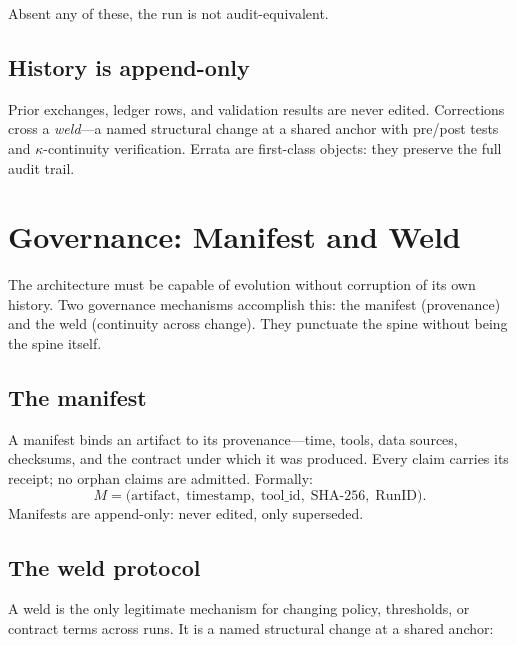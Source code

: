 \documentclass[
  aps,
  prd,
  twocolumn,
  superscriptaddress,
  nofootinbib,
  floatfix
]{revtex4-2}
\newcommand{\beq}{\begin{equation}}
\newcommand{\eeq}{\end{equation}}
\newcommand{\RunID}{\mathrm{RunID}}
\begin{document}
Absent any of these, the run is not audit-equivalent.

\subsection{History is append-only}

Prior exchanges, ledger rows, and validation results are never
edited.  Corrections cross a \emph{weld}---a named structural
change at a shared anchor with pre/post tests and
$\kappa$-continuity verification.  Errata are first-class objects:
they preserve the full audit trail.


\section{Governance: Manifest and Weld}\label{sec:governance}

The architecture must be capable of evolution without corruption
of its own history.  Two governance mechanisms accomplish this:
the manifest (provenance) and the weld (continuity across change).
They punctuate the spine without being the spine itself.

\subsection{The manifest}

A manifest binds an artifact to its provenance---time, tools, data
sources, checksums, and the contract under which it was produced.
Every claim carries its receipt; no orphan claims are admitted.
Formally:
\beq
  M = \bigl(\text{artifact},\; \text{timestamp},\;
  \text{tool\_id},\; \text{SHA-256},\; \RunID\bigr).
\eeq
Manifests are append-only: never edited, only superseded.

\subsection{The weld protocol}

A weld is the only legitimate mechanism for changing policy,
thresholds, or contract terms across runs.  It is a named
structural change at a shared anchor:
\end{document}
